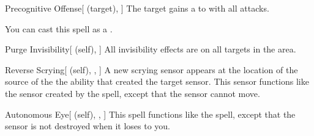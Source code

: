 \lowercase{\hypertarget{spell:Precognitive Offense}{}}\label{spell:Precognitive Offense}
\begin{attuneability}[Rank 3]{\hypertarget{spell:Precognitive Offense}{Precognitive Offense}}[ (target), ]
The target gains a   to  with all attacks.

You can cast this spell as a .
\end{attuneability}
\vspace{0.25em}



\lowercase{\hypertarget{spell:Purge Invisibility}{}}\label{spell:Purge Invisibility}
\begin{attuneability}[Rank 3]{\hypertarget{spell:Purge Invisibility}{Purge Invisibility}}[ (self), ]
All invisibility effects are  on all targets in the area.
\end{attuneability}
\vspace{0.25em}



\lowercase{\hypertarget{spell:Reverse Scrying}{}}\label{spell:Reverse Scrying}
\begin{attuneability}[Rank 3]{\hypertarget{spell:Reverse Scrying}{Reverse Scrying}}[ (self), , ]
A new scrying sensor appears at the location of the source of the the ability that created the target sensor.
This sensor functions like the sensor created by the  spell, except that the sensor cannot move.
\end{attuneability}
\vspace{0.25em}



\lowercase{\hypertarget{spell:Autonomous Eye}{}}\label{spell:Autonomous Eye}
\begin{attuneability}[Rank 4]{\hypertarget{spell:Autonomous Eye}{Autonomous Eye}}[ (self), , ]
This spell functions like the  spell, except that the sensor is not destroyed when it loses  to you.
\end{attuneability}
\vspace{0.25em}



